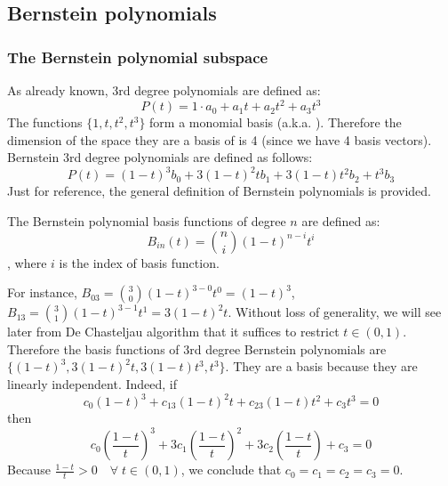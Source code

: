 \documentclass[a4paper]{article}
\begin{document}
\subsection{Bernstein polynomials}
\subsubsection{The Bernstein polynomial subspace}
As already known, 3rd degree polynomials are defined as:
\begin{equation*}
    P(t) = 1\cdot a_0 + a_1t + a_2t^2 + a_3t^3
\end{equation*}
The functions $\{1,t,t^2,t^3\}$ form a monomial basis (a.k.a. ). Therefore the dimension of the space they are a basis of is 4 (since we have 4 basis vectors). Bernstein  3rd degree polynomials are defined as follows:
\begin{equation}
    P(t) = (1-t)^3b_0 + 3(1-t)^2tb_1 + 3(1-t)t^2b_2 + t^3b_3
\end{equation}
Just for reference, the general definition of Bernstein polynomials is provided.
\begin{definition}
The Bernstein polynomial basis functions of degree $n$ are defined as:
\begin{equation}
    B_{in}(t) = {n \choose i}(1-t)^{n-i}t^i
    \label{eq:bernstein_coeffs_general}
\end{equation}
, where $i$ is the index of basis function.
\end{definition}
For instance, $B_{03}={3 \choose 0}(1-t)^{3-0}t^0 = (1-t)^3$, $B_{13}={3 \choose 1}(1-t)^{3-1}t^1 = 3(1-t)^2t$. Without loss of generality, we will see later from De Chasteljau algorithm that it suffices to restrict $t\in(0,1)$. Therefore the basis functions of 3rd degree Bernstein polynomials are $\{(1-t)^3,3(1-t)^2t,3(1-t)t^3,t^3\}$. They are a basis because they are linearly independent. Indeed, if
\[
    c_0(1-t)^3 + c_13(1-t)^2t + c_23(1-t)t^2 + c_3t^3 = 0 
\]
then
\[
    c_0 \left(\frac{1-t}{t}\right)^3 + 3 c_1 \left(\frac{1-t}{t}\right)^2 + 3 c_2 \left(\frac{1-t}{t}\right) + c_3 = 0
\]
Because $\frac{1-t}{t} > 0 \quad \forall \; t \in (0,1)$, we conclude that $c_0=c_1=c_2=c_3 = 0$.
\end{document}

